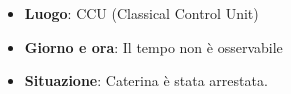 \begin{center}
\begin{minipage}{0.7\textwidth}
    \centering
\end{minipage}
\end{center}


\begin{tcolorbox}[colback=gray!5,colframe=gray!80,title=\textbf{Scheda Informativa}]
\begin{itemize}
    \item \textbf{Luogo}: CCU (Classical Control Unit)
    \item \textbf{Giorno e ora}: Il tempo non è osservabile
    \item \textbf{Situazione}: Caterina è stata arrestata.
\end{itemize}
\end{tcolorbox}



